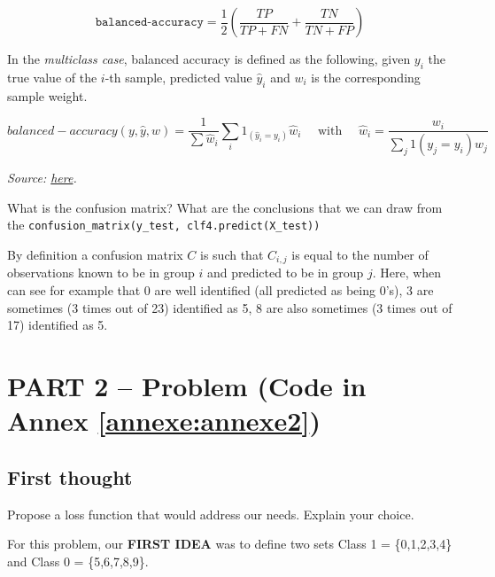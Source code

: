 \documentclass[10pt,a4paper]{article}
\theoremstyle{break}
\begin{document}
\[
\texttt{balanced-accuracy} = \frac{1}{2}\left( \frac{TP}{TP + FN} + \frac{TN}{TN + FP}\right )
\]

In the \emph{multiclass case}, balanced accuracy is defined as the following, given \(y_i\) the true value of the \(i\)-th sample, predicted value \(\hat{y}_i\) and \(w_i\) is the corresponding sample weight.

\[
balanced-accuracy(y,\hat y,w)=\frac{1}{\sum \hat w_i} \sum_i 1_{(\hat y_i = y_i)}\hat w_i
\quad \text{ with } \quad \hat{w}_i = \frac{w_i}{\sum_j{1(y_j = y_i) w_j}}
\]

\emph{Source: \href{https://scikit-learn.org/stable/modules/model_evaluation.html\#balanced-accuracy-score}{here}.}

\begin{tcolorbox}

What is the confusion matrix? What are the conclusions that we can draw from the \texttt{confusion\_matrix(y\_test,\ clf4.predict(X\_test))}

\end{tcolorbox}

By definition a confusion matrix \(C\) is such that \(C_{i,j}\) is equal to the number of observations known to be in group \(i\) and predicted to be in group \(j\).
Here, when can see for example that 0 are well identified (all predicted as being 0's), 3 are sometimes (3 times out of 23) identified as 5, 8 are also sometimes (3 times out of 17) identified as 5.

\hypertarget{part-2-problem-code-in-annex}{%
\section{\texorpdfstring{PART 2 -- Problem (Code in Annex \ref{annexe:annexe2})}{PART 2 -- Problem (Code in Annex )}}\label{part-2-problem-code-in-annex}}

\hypertarget{first-thought}{%
\subsection{First thought}\label{first-thought}}

\begin{tcolorbox}

Propose a loss function that would address our needs. Explain your choice.

\end{tcolorbox}

For this problem, our \textbf{FIRST IDEA} was to define two sets Class 1 = \{0,1,2,3,4\} and Class 0 = \{5,6,7,8,9\}.
\end{document}
